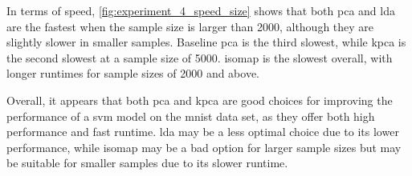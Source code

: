 In terms of speed, \ref{fig:experiment_4_speed_size} shows that both \gls{pca} and \gls{lda} are the fastest when the sample size is larger than 2000, although they are slightly slower in smaller samples. Baseline \gls{pca} is the third slowest, while \gls{kpca} is the second slowest at a sample size of 5000. \gls{isomap} is the slowest overall, with longer runtimes for sample sizes of 2000 and above.

Overall, it appears that both \gls{pca} and \gls{kpca} are good choices for improving the performance of a \gls{svm} model on the \gls{mnist} data set, as they offer both high performance and fast runtime. \gls{lda} may be a less optimal choice due to its lower performance, while \gls{isomap} may be a bad option for larger sample sizes but may be suitable for smaller samples due to its slower runtime.


